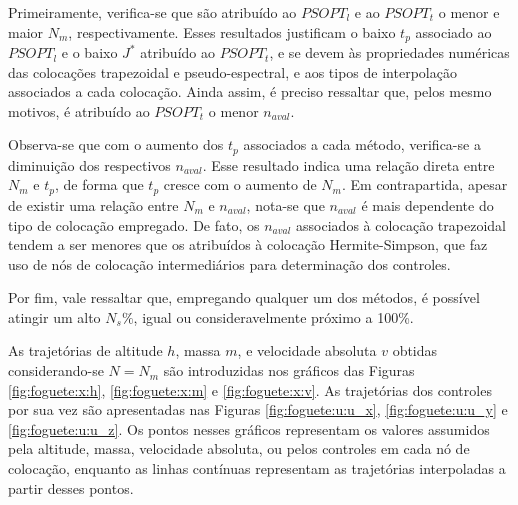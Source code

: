 

 
Primeiramente, verifica-se que são atribuído ao $ PSOPT_l $ e ao $ PSOPT_t $ o menor e maior $ N_m $, respectivamente. Esses resultados justificam o baixo $ t_p $ associado ao $ PSOPT_l $ e o baixo $ J^* $ atribuído ao $ PSOPT_t $, e se devem às propriedades numéricas das colocações trapezoidal e pseudo-espectral, e aos tipos de interpolação associados a cada colocação. Ainda assim, é preciso ressaltar que, pelos mesmo motivos, é atribuído ao $ PSOPT_t $ o menor $ n_{aval} $.

Observa-se que com o aumento dos $ t_p $ associados a cada método, verifica-se a diminuição dos respectivos $ n_{aval} $. Esse resultado indica uma relação direta entre $ N_m $ e $ t_p $, de forma que $ t_p $ cresce com o aumento de $ N_m $. Em contrapartida, apesar de existir uma relação entre $ N_m $ e $ n_{aval} $, nota-se que $ n_{aval} $ é mais dependente do tipo de colocação empregado. De fato, os $ n_{aval} $ associados à colocação trapezoidal tendem a ser menores que os atribuídos à colocação Hermite-Simpson, que faz uso de nós de colocação intermediários para determinação dos controles.

Por fim, vale ressaltar que, empregando qualquer um dos métodos, é possível atingir um alto $ N_s\% $, igual ou consideravelmente próximo a 100\%. 
 

As trajetórias de altitude $ h $, massa $ m $, e velocidade absoluta $ v $ obtidas considerando-se $ N = N_m $ são introduzidas nos gráficos das Figuras \ref{fig:foguete:x:h}, \ref{fig:foguete:x:m} e \ref{fig:foguete:x:v}. As trajetórias dos controles por sua vez são apresentadas nas Figuras \ref{fig:foguete:u:u_x}, \ref{fig:foguete:u:u_y} e \ref{fig:foguete:u:u_z}. Os pontos nesses gráficos representam os valores assumidos pela altitude, massa, velocidade absoluta, ou pelos controles em cada nó de colocação, enquanto as linhas contínuas representam as trajetórias interpoladas a partir desses pontos.

